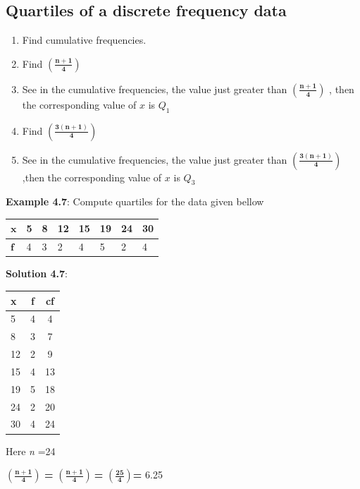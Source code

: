 \documentclass[
]{book}
\begin{document}
\hypertarget{quartiles-of-a-discrete-frequency-data}{%
\subsection{Quartiles of a discrete frequency data}\label{quartiles-of-a-discrete-frequency-data}}

\begin{enumerate}
\def\labelenumi{\arabic{enumi}.}
\item
  Find cumulative frequencies.
\item
  Find \(\left( \frac{\mathbf{n + 1}}{\mathbf{4}} \right)\)
\item
  See in the cumulative frequencies, the value just greater than
  \(\left( \frac{\mathbf{n + 1}}{\mathbf{4}} \right)\) , then the
  corresponding value of \(x\) is \(Q_{1}\)
\item
  Find \(\left( \frac{\mathbf{3(n + 1)}}{\mathbf{4}} \right)\)
\item
  See in the cumulative frequencies, the value just greater than
  \(\left( \frac{\mathbf{3(n + 1)}}{\mathbf{4}} \right)\) ,then the
  corresponding value of \(x\) is \(Q_{3}\)
\end{enumerate}

\textbf{Example 4.7}: Compute quartiles for the data given bellow

\begin{longtable}[]{@{}llllllll@{}}
\toprule
\(\mathbf{x}\) & 5 & 8 & 12 & 15 & 19 & 24 & 30 \\
\midrule
\endhead
\(\mathbf{f}\) & 4 & 3 & 2 & 4 & 5 & 2 & 4 \\
\bottomrule
\end{longtable}

\textbf{Solution 4.7}:

\begin{longtable}[]{@{}lcc@{}}
\toprule
x & f & cf \\
\midrule
\endhead
5 & 4 & 4 \\
8 & 3 & 7 \\
12 & 2 & 9 \\
15 & 4 & 13 \\
19 & 5 & 18 \\
24 & 2 & 20 \\
30 & 4 & 24 \\
\bottomrule
\end{longtable}

Here \emph{n} =24

\(\left( \frac{\mathbf{n + 1}}{\mathbf{4}} \right)\) \textbf{=}
\(\left( \frac{\mathbf{n + 1}}{\mathbf{4}} \right)\mathbf{\ }\)\textbf{=}
\(\left( \frac{\mathbf{25}}{\mathbf{4}} \right)\)\textbf{=} 6.25
\end{document}
